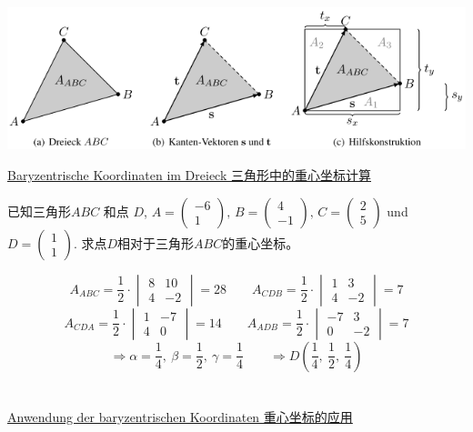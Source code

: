 \documentclass[fleqn]{article}
\begin{document}
\begin{center}
    \includegraphics[scale=0.6]{12.png}
\end{center}

\noindent\underline{Baryzentrische Koordinaten im Dreieck 三角形中的重心坐标计算}

已知三角形$ABC$ 和点 $D$, $A=\begin{pmatrix}
    -6\\1
\end{pmatrix},\,B=\begin{pmatrix}
    4\\-1
\end{pmatrix},\,C=\begin{pmatrix}
    2\\5
\end{pmatrix}$ und $D=\begin{pmatrix}
    1\\1
\end{pmatrix}$. 求点$D$相对于三角形$ABC$的重心坐标。

$$A_{ABC} = \frac {1}{2} \cdot 
\begin{vmatrix}
    8 & 10 \\
    4 & -2
\end{vmatrix} = 28\qquad 
A_{CDB} = \frac {1}{2} \cdot 
\begin{vmatrix}
    1 & 3 \\
    4 & -2
\end{vmatrix} = 7
$$$$A_{CDA} = \frac {1}{2} \cdot 
\begin{vmatrix}
    1 & -7 \\
    4 & 0
\end{vmatrix} = 14
\qquad A_{ADB} = \frac {1}{2} \cdot 
\begin{vmatrix}
    -7 & 3 \\
    0 & -2
\end{vmatrix} = 7
$$
$$\Rightarrow \alpha = \frac{1}{4} ,\ \beta = \frac{1}{2} ,\ \gamma = \frac{1}{4}
\qquad \Rightarrow D(\frac{1}{4},\ \frac{1}{2},\ \frac{1}{4})$$
\\
\\
\noindent\underline{Anwendung der baryzentrischen Koordinaten 重心坐标的应用}
\end{document}
